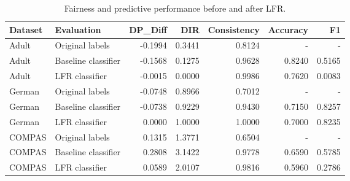 \begin{table}
\caption{Fairness and predictive performance before and after LFR.}
\label{tab:lfr_results}
\begin{tabular}{llrrrrr}
\toprule
Dataset & Evaluation & DP_Diff & DIR & Consistency & Accuracy & F1 \\
\midrule
Adult & Original labels & -0.1994 & 0.3441 & 0.8124 & - & - \\
Adult & Baseline classifier & -0.1568 & 0.1275 & 0.9628 & 0.8240 & 0.5165 \\
Adult & LFR classifier & -0.0015 & 0.0000 & 0.9986 & 0.7620 & 0.0083 \\
German & Original labels & -0.0748 & 0.8966 & 0.7012 & - & - \\
German & Baseline classifier & -0.0738 & 0.9229 & 0.9430 & 0.7150 & 0.8257 \\
German & LFR classifier & 0.0000 & 1.0000 & 1.0000 & 0.7000 & 0.8235 \\
COMPAS & Original labels & 0.1315 & 1.3771 & 0.6504 & - & - \\
COMPAS & Baseline classifier & 0.2808 & 3.1422 & 0.9778 & 0.6590 & 0.5785 \\
COMPAS & LFR classifier & 0.0589 & 2.0107 & 0.9816 & 0.5960 & 0.2786 \\
\bottomrule
\end{tabular}
\end{table}
